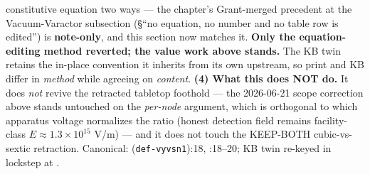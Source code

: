 constitutive equation two ways --- the chapter's Grant-merged precedent at the Vacuum-Varactor subsection (\S``no equation, no number and no table row is edited'') is \textbf{note-only}, and this section now matches it. \textbf{Only the equation-editing method reverted; the value work above stands.} The KB twin retains the in-place convention it inherits from its own upstream, so print and KB differ in \emph{method} while agreeing on \emph{content}. \textbf{(4) What this does NOT do.} It does \emph{not} revive the retracted tabletop foothold --- the 2026-06-21 scope correction above stands untouched on the \emph{per-node} argument, which is orthogonal to which apparatus voltage normalizes the ratio (honest detection field remains facility-class $E \approx 1.3\times10^{15}$ V/m) --- and it does not touch the KEEP-BOTH cubic-vs-sextic retraction. Canonical:  (\texttt{def-vyvsn1}):18, :18--20; KB twin re-keyed in lockstep at .

